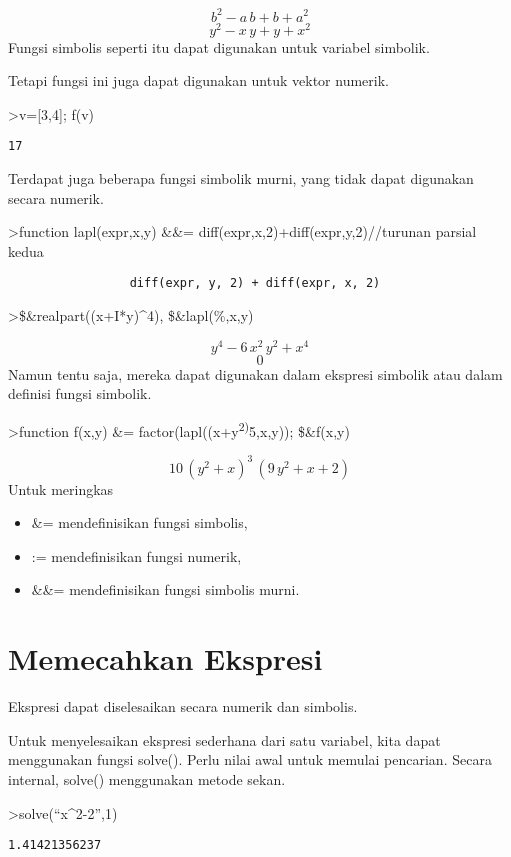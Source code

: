 \documentclass[
]{book}
\begin{document}
\[b^2-a\,b+b+a^2\] \[y^2-x\,y+y+x^2\]Fungsi simbolis seperti itu dapat digunakan untuk variabel simbolik.

Tetapi fungsi ini juga dapat digunakan untuk vektor numerik.

\textgreater v={[}3,4{]}; f(v)

\begin{verbatim}
17
\end{verbatim}

Terdapat juga beberapa fungsi simbolik murni, yang tidak dapat digunakan secara numerik.

\textgreater function lapl(expr,x,y) \&\&= diff(expr,x,2)+diff(expr,y,2)//turunan parsial kedua

\begin{verbatim}
                 diff(expr, y, 2) + diff(expr, x, 2)
\end{verbatim}

\textgreater\$\&realpart((x+I*y)\^{}4), \$\&lapl(\%,x,y)

\[y^4-6\,x^2\,y^2+x^4\] \[0\]Namun tentu saja, mereka dapat digunakan dalam ekspresi simbolik atau dalam definisi fungsi simbolik.

\textgreater function f(x,y) \&= factor(lapl((x+y\textsuperscript{2)}5,x,y)); \$\&f(x,y)

\[10\,\left(y^2+x\right)^3\,\left(9\,y^2+x+2\right)\]Untuk meringkas

\begin{itemize}
\item
  \&= mendefinisikan fungsi simbolis,
\item
  := mendefinisikan fungsi numerik,
\item
  \&\&= mendefinisikan fungsi simbolis murni.
\end{itemize}

\chapter{Memecahkan Ekspresi}\label{memecahkan-ekspresi}

Ekspresi dapat diselesaikan secara numerik dan simbolis.

Untuk menyelesaikan ekspresi sederhana dari satu variabel, kita dapat menggunakan fungsi solve(). Perlu nilai awal untuk memulai pencarian. Secara internal, solve() menggunakan metode sekan.

\textgreater solve(``x\^{}2-2'',1)

\begin{verbatim}
1.41421356237
\end{verbatim}
\end{document}
